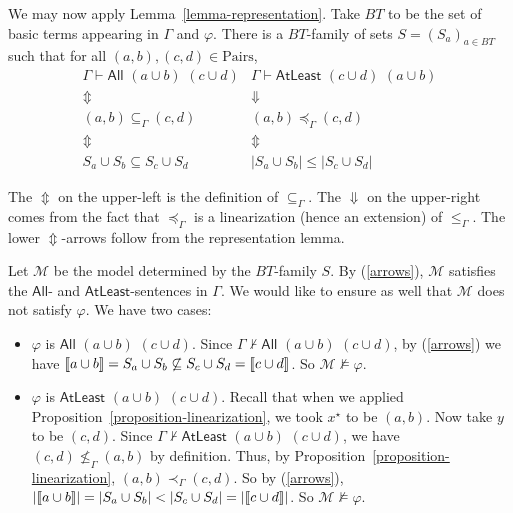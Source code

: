 \documentclass[letterpaper]{article}
\theoremstyle{definition}
\newcommand{\semantics}[1]{[\![\mbox{\em $ #1 $\/}]\!]}
\newcommand{\Model}{\mathcal{M}}
\newcommand{\proves}{\vdash}
\newcommand{\All}[2]{\mathsf{All}\,\,#1\,\,#2}
\newcommand{\Atleast}[2]{\mathsf{AtLeast}\,\,#1\,\,#2}
\newcommand{\AllNoArgs}{\mathsf{All}}
\newcommand{\AtleastNoArgs}{\mathsf{AtLeast}}
\newcommand{\Pairs}{\mbox{Pairs}}
\newcommand{\provsub}{\subseteq_{\Gamma}}
\newcommand{\provle}{\le_{\Gamma}}
\newcommand{\provextended}{\preceq_{\Gamma}}
\newcommand{\provextendedstrict}{\prec_{\Gamma}}
\begin{document}
We may now apply Lemma~\ref{lemma-representation}. Take $BT$ to be the set of basic terms appearing in $\Gamma$ and $\varphi$.  There is a $BT$-family of sets $S = (S_a)_{a\in BT}$ such that for all 
$(a,b),(c,d) \in \Pairs$,
\begin{equation}
\label{arrows}
\begin{array}{cc}
\Gamma \proves \All{(a \cup b)}{(c \cup d)} & 
\Gamma \proves \Atleast{(c \cup d)}{(a \cup b)}\\
\Updownarrow &
\Downarrow\\
(a,b) \provsub (c,d) &
(a,b) \provextended (c,d)\\
\Updownarrow &
\Updownarrow\\
S_a \cup S_b \subseteq S_c \cup S_d &
|S_a \cup S_b| \le |S_c \cup S_d|
\end{array}
\end{equation}

The $\Updownarrow$ on the upper-left  is the definition of $\provsub$.
The $\Downarrow$ on the upper-right comes from the fact that $\provextended$ is a linearization (hence an extension) of $\provle$.  The lower $\Updownarrow$-arrows follow from the representation lemma.

Let $\Model$ be the model determined by the $BT$-family $S$. By (\ref{arrows}), $\Model$ satisfies the $\AllNoArgs$- and $\AtleastNoArgs$-sentences in $\Gamma$.  We would like to ensure as well that $\Model$ does not satisfy $\varphi$.  We have two cases:

\begin{itemize}
    \item $\varphi$ is $\All{(a \cup b)}{(c \cup d)}$.
    Since $\Gamma \not \proves \All{(a \cup b)}{(c \cup d)}$, by (\ref{arrows}) we have $\semantics{a \cup b} = S_a \cup S_b \not \subseteq S_c \cup S_d = \semantics{c \cup d}$.  So $\Model \not \models \varphi$.
    
    \item $\varphi$ is $\Atleast{(a \cup b)}{(c \cup d)}$.
    Recall that when we applied Proposition~\ref{proposition-linearization}, we took $x^\star$ to be $(a, b)$.  Now take $y$ to be $(c, d)$.  Since $\Gamma \not \proves \Atleast{(a \cup b)}{(c \cup d)}$, we have $(c, d) \not \provle (a, b)$ by definition.  Thus, by Proposition~\ref{proposition-linearization}, $(a, b) \provextendedstrict (c, d)$.  So by (\ref{arrows}), $|\semantics{a \cup b}| = |S_a \cup S_b| < |S_c \cup S_d| = |\semantics{c \cup d}|$.  So $\Model \not \models \varphi$.
    
\end{itemize}
\end{document}
